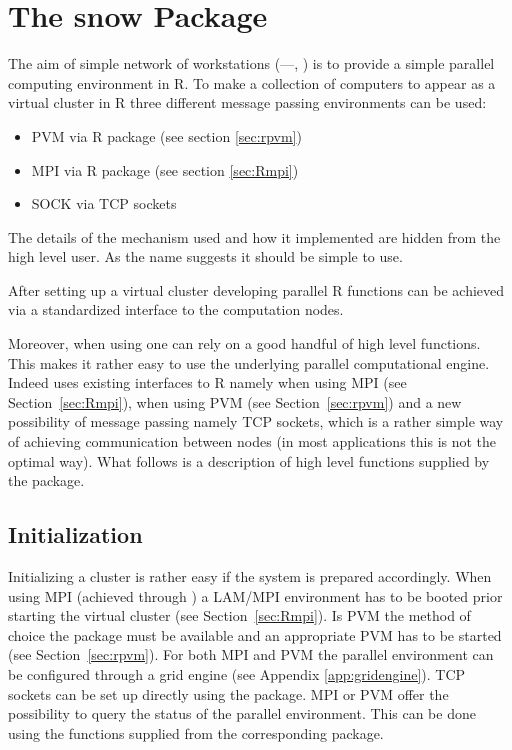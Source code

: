\section{The snow Package}
\label{sec:snow}
The aim of simple network of workstations
(---\cite{rossini03snow}, \cite{tierney07snow}) is to
provide a simple parallel computing environment in R. To make a
collection of computers to appear as a virtual cluster in R 
three different message passing environments can be used:

\begin{itemize}
\item PVM via R package  (see section \ref{sec:rpvm})
\item MPI via R package  (see section \ref{sec:Rmpi})
\item SOCK via TCP sockets
\end{itemize}

The details of the mechanism used and how it implemented are hidden
from the high level user. As the name suggests it should be simple to
use.

After setting up a virtual cluster developing parallel R functions
can be achieved via a standardized interface to the computation
nodes.

Moreover, when using  one can rely on a good handful of
high level functions. This makes it rather easy to use the underlying
parallel computational engine.
Indeed  uses existing interfaces to R namely  when
using MPI (see Section~\ref{sec:Rmpi}),  when using PVM (see
Section~\ref{sec:rpvm}) and a new possibility of message passing namely
TCP sockets, which is a rather simple way of achieving communication
between nodes (in most applications this is not the optimal way).
What follows is a description of high level functions supplied by the
 package. %


\subsection{Initialization}

Initializing a  cluster is rather easy if the system is
prepared accordingly. When using MPI (achieved through ) a
LAM/MPI environment has to be booted prior starting the virtual
cluster (see Section~\ref{sec:Rmpi}). Is PVM the method of choice the
 package must be available and an appropriate PVM has to be
started (see Section~\ref{sec:rpvm}). For both MPI and PVM the
parallel environment 
can be configured through a grid engine (see Appendix
\ref{app:gridengine}). TCP sockets can be set up directly using the
package. MPI or PVM offer the possibility to query the status of the
parallel environment. This can be done using the functions supplied
from the corresponding package.

